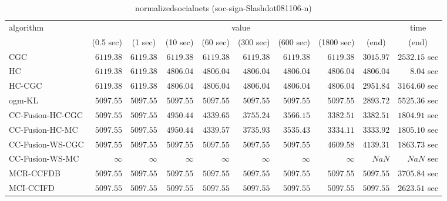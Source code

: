 \begin{table}[H]
\scriptsize
\centering
\caption{normalizedsocialnets (soc-sign-Slashdot081106-n)}
\label{tab:anytimetable-normalizedsocialnets-soc-sign-Slashdot081106-n}
\begin{tabular}{lrrrrrrrrr}
\toprule
           algorithm &                                   \multicolumn{8}{c}{value} & \multicolumn{1}{c}{time}   \\  
\cmidrule(lr){2-9}\cmidrule(lr){10-10}   
                     & \multicolumn{1}{c}{(0.5 sec)} & \multicolumn{1}{c}{(1 sec)} & \multicolumn{1}{c}{(10 sec)} & \multicolumn{1}{c}{(60 sec)} & \multicolumn{1}{c}{(300 sec)} & \multicolumn{1}{c}{(600 sec)} & \multicolumn{1}{c}{(1800 sec)} & \multicolumn{1}{c}{(end)} & \multicolumn{1}{c}{(end)}   \\ \midrule 
                 CGC & $      6119.38$ & $      6119.38$ & $      6119.38$ & $      6119.38$ & $      6119.38$ & $      6119.38$ & $      6119.38$ & $      3015.97$ & $      2532.15$ sec   \\ 
                  HC & $      6119.38$ & $      6119.38$ & $      4806.04$ & $      4806.04$ & $      4806.04$ & $      4806.04$ & $      4806.04$ & $      4806.04$ & $         8.04$ sec   \\ 
              HC-CGC & $      6119.38$ & $      6119.38$ & $      4806.04$ & $      4806.04$ & $      4806.04$ & $      4806.04$ & $      4806.04$ & $      2951.84$ & $      3164.60$ sec   \\ 
              ogm-KL & $      5097.55$ & $      5097.55$ & $      5097.55$ & $      5097.55$ & $      5097.55$ & $      5097.55$ & $      5097.55$ & $      2893.72$ & $      5525.36$ sec   \\ 
    CC-Fusion-HC-CGC & $      5097.55$ & $      5097.55$ & $      4950.44$ & $      4339.65$ & $      3755.24$ & $      3566.15$ & $      3382.51$ & $      3382.51$ & $      1804.91$ sec   \\ 
     CC-Fusion-HC-MC & $      5097.55$ & $      5097.55$ & $      4950.44$ & $      4339.57$ & $      3735.93$ & $      3535.43$ & $      3334.11$ & $      3333.92$ & $      1805.10$ sec   \\ 
    CC-Fusion-WS-CGC & $      5097.55$ & $      5097.55$ & $      5097.55$ & $      5097.55$ & $      5097.55$ & $      5097.55$ & $      4609.58$ & $      4139.31$ & $      1863.73$ sec   \\ 
     CC-Fusion-WS-MC & $\infty$ & $\infty$ & $\infty$ & $\infty$ & $\infty$ & $\infty$ & $\infty$ & $          NaN$ & $          NaN$ sec   \\ 
\cmidrule{1-1} 
           MCR-CCFDB & $      5097.55$ & $      5097.55$ & $      5097.55$ & $      5097.55$ & $      5097.55$ & $      5097.55$ & $      5097.55$ & $      5097.55$ & $      3705.84$ sec   \\ 
\cmidrule{1-1} 
           MCI-CCIFD & $      5097.55$ & $      5097.55$ & $      5097.55$ & $      5097.55$ & $      5097.55$ & $      5097.55$ & $      5097.55$ & $      5097.55$ & $      2623.51$ sec   \\ 
\bottomrule
\end{tabular}
\end{table}

